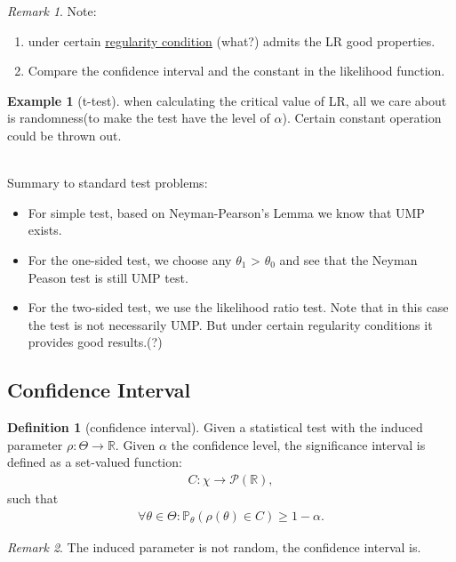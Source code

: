\documentclass[a4paper,12pt, oneside, fleqn]{book}
\theoremstyle{definition}
\newtheorem{definition}{Definition}[section]
\newtheorem*{example}{Example}
\theoremstyle{remark}
\newtheorem*{remark}{Remark}
\begin{document}
\begin{remark}
Note:
\begin{enumerate}
    \item under certain \underline{regularity condition} (what?) admits the LR good properties.
    \item Compare the confidence interval and the constant in the likelihood function.
\end{enumerate}
\end{remark}

\begin{example}[t-test]
when calculating the critical value of LR, all we care about is randomness(to make the test have the level of $\alpha$). Certain constant operation could be thrown out.
\end{example}


\quad\\
Summary to standard test problems:
\begin{itemize}
    \item For simple test, based on Neyman-Pearson's Lemma we know that UMP exists.
    \item For the one-sided test, we choose any $\theta_1$ > $\theta_0$ and see that the Neyman Peason test is still UMP test.
    \item For the two-sided test, we use the likelihood ratio test. Note that in this case the test is not necessarily UMP. But under certain regularity conditions it provides good results.(?)
\end{itemize}


\subsection{Confidence Interval}
\begin{definition}[confidence interval]
Given a statistical test with the induced parameter $\rho: \Theta \rightarrow \mathbb{R}$. Given $\alpha$ the confidence level,  the significance interval is defined as a set-valued function:
\begin{align*}
	C:\chi \rightarrow \mathcal{P}(\mathbb{R}),
\end{align*}
such that
\begin{align*}
	\forall \theta \in \Theta: \mathbb{P}_\theta(\rho(\theta) \in C) \ge 1 - \alpha. 
\end{align*}
\end{definition}
\begin{remark}
The induced parameter is not random, the confidence interval is. 	
\end{remark}
\end{document}
